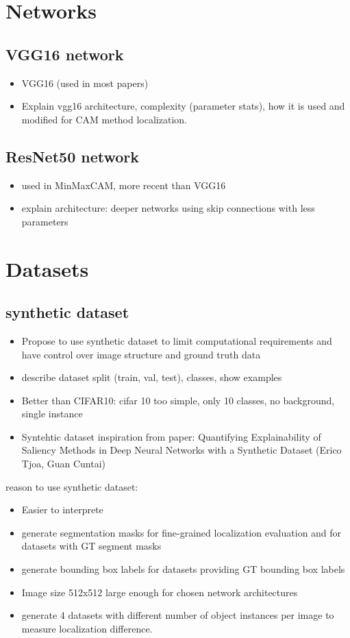 \section{Networks}
\subsection{VGG16 network}
\begin{itemize}
    \item VGG16 (used in most papers)
    \item Explain vgg16 architecture, complexity (parameter stats), how it is used and modified for CAM method localization.
\end{itemize}

\subsection{ResNet50 network}
\begin{itemize}
    \item used in MinMaxCAM, more recent than VGG16
    \item explain architecture: deeper networks using skip connections with less parameters
\end{itemize}

\section{Datasets}
\subsection{synthetic dataset}
\begin{itemize}
    \item Propose to use synthetic dataset to limit computational requirements and have control over image structure and ground truth data
    \item describe dataset split (train, val, test), classes, show examples
    \item Better than CIFAR10: cifar 10 too simple, only 10 classes, no background, single instance
    \item Syntehtic dataset inspiration from paper: Quantifying Explainability of Saliency Methods in Deep Neural Networks with a Synthetic Dataset (Erico Tjoa, Guan Cuntai)
\end{itemize}
reason to use synthetic dataset:
\begin{itemize}
    \item Easier to interprete
    \item generate segmentation masks for fine-grained localization evaluation and for datasets with GT segment masks
    \item generate bounding box labels for datasets providing GT bounding box labels
    \item Image size 512x512 large enough for chosen network architectures
    \item generate 4 datasets with different number of object instances per image to measure localization difference.
\end{itemize}

